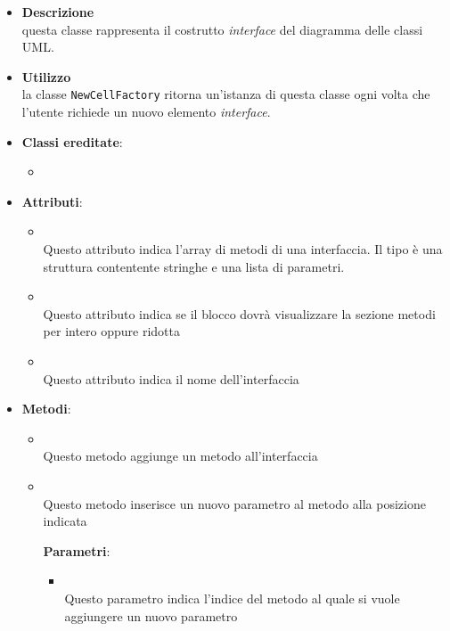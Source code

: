 \label{\nogloxy{swedesigner::client::model::celltypes::class::HxInterface}}
\begin{itemize}
\item \textbf{Descrizione}\\
questa classe rappresenta il costrutto \emph{interface} del diagramma delle classi UML.
\item \textbf{Utilizzo}\\
la classe \texttt{NewCellFactory} ritorna un'istanza di questa classe ogni volta che l'utente richiede un nuovo elemento \emph{interface}.
\item \textbf{Classi ereditate}:
\begin{itemize}
\item \hyperref[\nogloxy{swedesigner::client::model::celltypes::class::ClassDiagramElement}]{}
\end{itemize}
\item \textbf{Attributi}:
\begin{itemize}
\item {}
\\ Questo attributo indica l'array di metodi di una interfaccia. Il tipo è una struttura contentente stringhe e una lista di parametri.
\item {}
\\ Questo attributo indica se il blocco dovrà visualizzare la sezione metodi per intero oppure ridotta

\item {}
\\ Questo attributo indica il nome dell'interfaccia

\end{itemize}
\item \textbf{Metodi}:
\begin{itemize}
\item {}
\\ Questo metodo aggiunge un metodo all'interfaccia
\item {}
\\ Questo metodo inserisce un nuovo parametro al metodo alla posizione indicata

\textbf{Parametri}:
\begin{itemize}
\item {}
\\ Questo parametro indica l'indice del metodo al quale si vuole aggiungere un nuovo parametro


\end{itemize}
\end{itemize}
\end{itemize}
